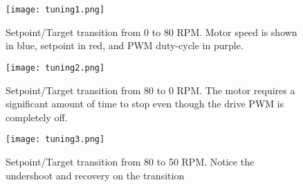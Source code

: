 \documentclass[openany,11pt,fleqn]{book} %
\begin{document}
\begin{figure}[b!]
	\begin{center}
		\hspace*{-3.4cm}
		\texttt{[image: tuning1.png]}
		\caption{Setpoint/Target transition from 0 to 80 RPM. Motor speed is shown in blue, setpoint in red, and PWM duty-cycle in purple. }
		\label{tuning1}
	\end{center}
\end{figure}

\begin{figure}[]
	\begin{center}
		\hspace*{-3.4cm}
		\texttt{[image: tuning2.png]}
		\caption{Setpoint/Target transition from 80 to 0 RPM. The motor requires a significant amount of time to stop even though the drive PWM is completely off. }
		\label{tuning2}
	\end{center}
\end{figure}


\begin{figure}[]
	\begin{center}
		\hspace*{-3.4cm}
		\texttt{[image: tuning3.png]}
		\caption{Setpoint/Target transition from 80 to 50 RPM. Notice the undershoot and recovery on the transition}
		\label{tuning3}
	\end{center}
\end{figure}
\end{document}
